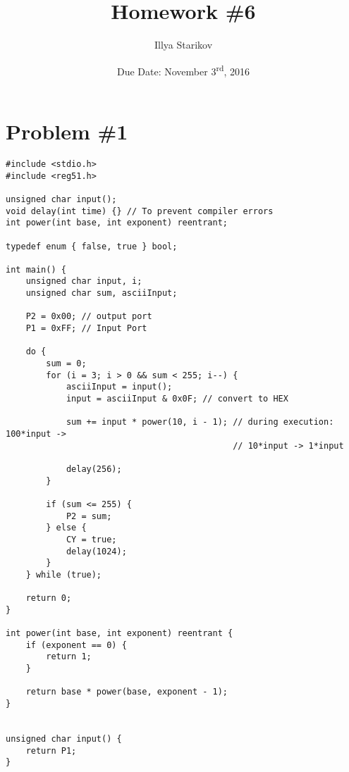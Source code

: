 \documentclass[12pt]{article}
\title{Homework \#6}
\date{Due Date: November 3\textsuperscript{rd}, 2016}
\author{Illya Starikov}
\begin{document}
\maketitle

\section{Problem \#1}
\begin{verbatim}
#include <stdio.h>
#include <reg51.h>

unsigned char input();
void delay(int time) {} // To prevent compiler errors
int power(int base, int exponent) reentrant;

typedef enum { false, true } bool;

int main() {
    unsigned char input, i;
    unsigned char sum, asciiInput;

    P2 = 0x00; // output port
    P1 = 0xFF; // Input Port

    do {
        sum = 0;
        for (i = 3; i > 0 && sum < 255; i--) {
            asciiInput = input();
            input = asciiInput & 0x0F; // convert to HEX

            sum += input * power(10, i - 1); // during execution: 100*input ->
                                             // 10*input -> 1*input

            delay(256);
        }

        if (sum <= 255) {
            P2 = sum;
        } else {
            CY = true;
            delay(1024);
        }
    } while (true);

    return 0;
}

int power(int base, int exponent) reentrant {
    if (exponent == 0) {
        return 1;
    }

    return base * power(base, exponent - 1);
}


unsigned char input() {
    return P1;
}
\end{verbatim}
\end{document}
